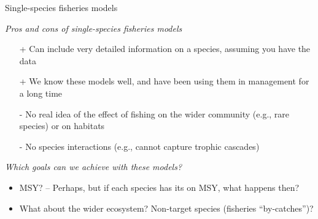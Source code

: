 \documentclass[xcolor={usenames,x11names},compress]{beamer}
\renewcommand{\(}{\begin{columns}}
\renewcommand{\)}{\end{columns}}
\newcommand{\<}[1]{\begin{column}{#1}}
\renewcommand{\>}{\end{column}}
\begin{document}
\begin{frame}{Single-species fisheries models}

  \textit{Pros and cons of single-species fisheries models}
  \begin{itemize} [<+->]\itemsep6pt
    \item[+] Can include very detailed information on a species, assuming you
      have the data

      \item[+] We know these models well, and have been using them in management
      for a long time

      \item[-] No real idea of the effect of fishing on the wider community
      (e.g., rare species) or on habitats

      \item[-] No species interactions (e.g., cannot capture trophic cascades)

    \end{itemize}
  \vspace{10pt}
  \pause
  \textit{Which goals can we achieve with these models?} 
  \begin{itemize} [<+->]
    \item MSY? -- Perhaps, but if each species has its on MSY, what happens then?
    \item What about the wider ecosystem? Non-target species (fisheries ``by-catches'')?
\end{itemize}
\end{frame}
\end{document}
